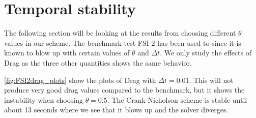 \section{Temporal stability}
The following section will be looking at the results from choosing different $\theta$ values in our scheme. The benchmark test FSI-2 has been used to since it is known to blow up with certain values of $\theta$ and $\Delta t$. We only study the effects of Drag as the three other quantities shows the same behavior.   

\ref{fig:FSI2drag_plots} show the plots of Drag with $\Delta t = 0.01$. This will not produce very good drag values compared to the benchmark, but it shows the instability when choosing $\theta = 0.5$. The Crank-Nicholson scheme is stable until about 13 seconds where we see that it blows up and the solver diverges.
